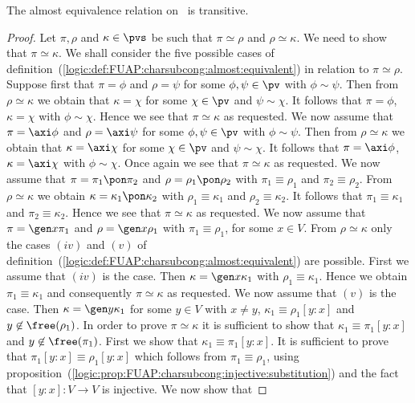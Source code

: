 \begin{prop}\label{logic:prop:FUAP:subcong:almost:transitive}
The almost equivalence relation on \pvs\ is transitive.
\end{prop}
\begin{proof}
Let $\pi,\rho$ and $\kappa\in\pvs$ be such that $\pi\simeq\rho$ and
$\rho\simeq\kappa$. We need to show that $\pi\simeq\kappa$. We shall
consider the five possible cases of
definition~(\ref{logic:def:FUAP:charsubcong:almost:equivalent}) in
relation to $\pi\simeq\rho$. Suppose first that $\pi=\phi$ and
$\rho=\psi$ for some $\phi,\psi\in\pv$ with $\phi\sim\psi$. Then
from $\rho\simeq\kappa$ we obtain that $\kappa=\chi$ for some
$\chi\in\pv$ and $\psi\sim\chi$. It follows that $\pi=\phi$,
$\kappa=\chi$ with $\phi\sim\chi$. Hence we see that
$\pi\simeq\kappa$ as requested. We now assume that $\pi=\axi\phi$
and $\rho=\axi\psi$ for some $\phi,\psi\in\pv$ with $\phi\sim\psi$.
Then from $\rho\simeq\kappa$ we obtain that $\kappa=\axi\chi$ for
some $\chi\in\pv$ and $\psi\sim\chi$. It follows that
$\pi=\axi\phi$, $\kappa=\axi\chi$ with $\phi\sim\chi$. Once again we
see that $\pi\simeq\kappa$ as requested. We now assume that
$\pi=\pi_{1}\pon\pi_{2}$ and $\rho=\rho_{1}\pon\rho_{2}$ with
$\pi_{1}\equiv\rho_{1}$ and $\pi_{2}\equiv\rho_{2}$. From
$\rho\simeq\kappa$ we obtain $\kappa=\kappa_{1}\pon\kappa_{2}$ with
$\rho_{1}\equiv\kappa_{1}$ and $\rho_{2}\equiv\kappa_{2}$. It
follows that $\pi_{1}\equiv\kappa_{1}$ and
$\pi_{2}\equiv\kappa_{2}$. Hence we see that $\pi\simeq\kappa$ as
requested. We now assume that $\pi=\gen x\pi_{1}$ and $\rho=\gen
x\rho_{1}$ with $\pi_{1}\equiv\rho_{1}$, for some $x\in V$. From
$\rho\simeq\kappa$ only the cases $(iv)$ and $(v)$ of
definition~(\ref{logic:def:FUAP:charsubcong:almost:equivalent}) are
possible. First we assume that $(iv)$ is the case. Then $\kappa=\gen
x\kappa_{1}$ with $\rho_{1}\equiv\kappa_{1}$. Hence we obtain
$\pi_{1}\equiv\kappa_{1}$ and consequently $\pi\simeq\kappa$ as
requested. We now assume that $(v)$ is the case. Then $\kappa=\gen
y\kappa_{1}$ for some $y\in V$ with $x\neq y$,
$\kappa_{1}\equiv\rho_{1}[y\!:\!x]$ and $y\not\in\free(\rho_{1})$.
In order to prove $\pi\simeq\kappa$ it is sufficient to show that
$\kappa_{1}\equiv\pi_{1}[y\!:\!x]$ and $y\not\in\free(\pi_{1})$.
First we show that $\kappa_{1}\equiv\pi_{1}[y\!:\!x]$. It is
sufficient to prove that $\pi_{1}[y\!:\!x]\equiv\rho_{1}[y\!:\!x]$
which follows from $\pi_{1}\equiv\rho_{1}$, using
proposition~(\ref{logic:prop:FUAP:charsubcong:injective:substitution})
and the fact that $[y\!:\!x]:V\to V$ is injective. We now show that

\end{proof}
